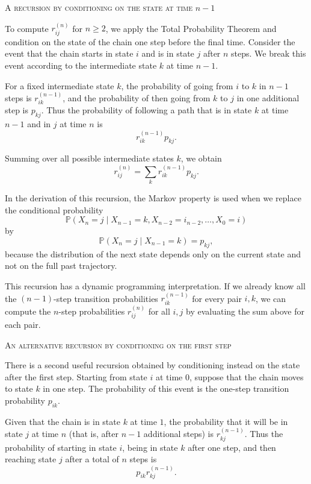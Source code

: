 \bigskip
\textsc{A recursion by conditioning on the state at time \(n-1\)}

To compute \(r_{ij}^{(n)}\) for \(n \ge 2\), we apply the Total Probability Theorem and condition on the state of the chain one step before the final time.
Consider the event that the chain starts in state \(i\) and is in state \(j\) after \(n\) steps.
We break this event according to the intermediate state \(k\) at time \(n-1\).

For a fixed intermediate state \(k\), the probability of going from \(i\) to \(k\) in \(n-1\) steps is \(r_{ik}^{(n-1)}\), and the probability of then going from \(k\) to \(j\) in one additional step is \(p_{kj}\).
Thus the probability of following a path that is in state \(k\) at time \(n-1\) and in \(j\) at time \(n\) is
\[
r_{ik}^{(n-1)} p_{kj}.
\]

Summing over all possible intermediate states \(k\), we obtain
\[
r_{ij}^{(n)}
=
\sum_{k} r_{ik}^{(n-1)} p_{kj}.
\]

In the derivation of this recursion, the Markov property is used when we replace the conditional probability
\[
\mathbb{P}(X_n = j \mid X_{n-1} = k, X_{n-2} = i_{n-2}, \dots, X_0 = i)
\]
by
\[
\mathbb{P}(X_n = j \mid X_{n-1} = k)
=
p_{kj},
\]
because the distribution of the next state depends only on the current state and not on the full past trajectory.

This recursion has a dynamic programming interpretation.
If we already know all the \((n-1)\)-step transition probabilities \(r_{ik}^{(n-1)}\) for every pair \(i,k\), we can compute the \(n\)-step probabilities \(r_{ij}^{(n)}\) for all \(i,j\) by evaluating the sum above for each pair.

\bigskip
\textsc{An alternative recursion by conditioning on the first step}

There is a second useful recursion obtained by conditioning instead on the state after the first step.
Starting from state \(i\) at time \(0\), suppose that the chain moves to state \(k\) in one step.
The probability of this event is the one-step transition probability \(p_{ik}\).

Given that the chain is in state \(k\) at time \(1\), the probability that it will be in state \(j\) at time \(n\) (that is, after \(n-1\) additional steps) is \(r_{kj}^{(n-1)}\).
Thus the probability of starting in state \(i\), being in state \(k\) after one step, and then reaching state \(j\) after a total of \(n\) steps is
\[
p_{ik} r_{kj}^{(n-1)}.
\]

